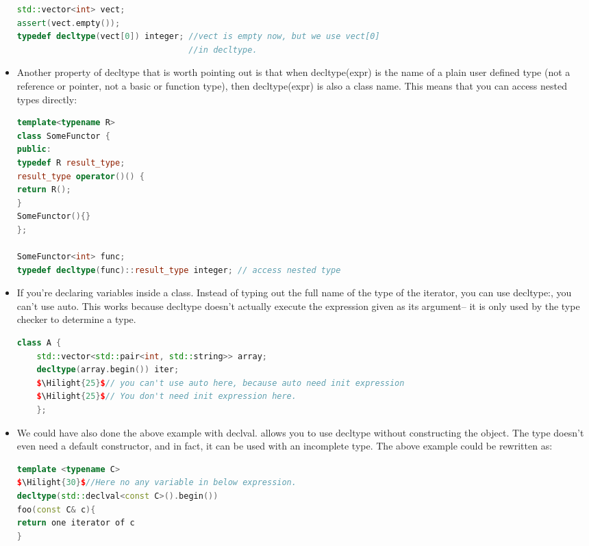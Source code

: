 \documentclass[a4paper,12pt,twoside]{book}
\newcommand{\Hilight}[1]{\makebox[0pt][l]{\color{yellow}\rule[-3pt]{#1em}{11pt}}}
\begin{document}
\begin{itemize}
\begin{lstlisting}[frame=single, language=c++, mathescape=true]
std::vector<int> vect;
assert(vect.empty());
typedef decltype(vect[0]) integer; //vect is empty now, but we use vect[0]
                                   //in decltype.
\end{lstlisting}
	
	\item Another property of decltype that is worth pointing out is that when decltype(expr) is the name of a plain user defined type (not a reference or pointer, not a basic or function type), then decltype(expr) is also a class name. This means that you can access nested types directly:
\begin{lstlisting}[frame=single, language=c++, mathescape=true]
template<typename R>
class SomeFunctor {
public:
typedef R result_type;
result_type operator()() {
return R();
}
SomeFunctor(){}
};

SomeFunctor<int> func;
typedef decltype(func)::result_type integer; // access nested type
\end{lstlisting}
	
	\item  If you're declaring variables inside a class. Instead of typing out the full name of the type of the iterator, you can use decltype:, you can't use auto.  This works because decltype doesn't actually execute the expression given as its argument-- it is only used by the type checker to determine a type.
\begin{lstlisting}[frame=single, language=c++, mathescape=true]
	class A {
	std::vector<std::pair<int, std::string>> array;
	decltype(array.begin()) iter;
	$\Hilight{25}$// you can't use auto here, because auto need init expression
	$\Hilight{25}$// You don't need init expression here.
	};
\end{lstlisting}
	
	\item We could have also done the above example with declval. allows you to use decltype without constructing the object. The type doesn't even need a default constructor, and in fact, it can be used with an incomplete type. The above example could be rewritten as:
	
\begin{lstlisting}[frame=single, language=c++, mathescape=true]
template <typename C>
$\Hilight{30}$//Here no any variable in below expression.
decltype(std::declval<const C>().begin())
foo(const C& c){
return one iterator of c
}
\end{lstlisting}
	

\end{itemize}
\end{document}
